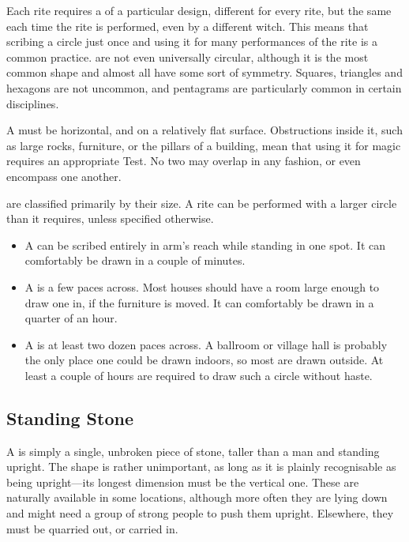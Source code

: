 Each rite requires a  of a particular design, different for every rite, but the same each time the rite is performed, even by a different witch.
This means that scribing a circle just once and using it for many performances of the rite is a common practice.
 are not even universally circular, although it is the most common shape and almost all have some sort of symmetry.
Squares, triangles and hexagons are not uncommon, and pentagrams are particularly common in certain disciplines.

A  must be horizontal, and on a relatively flat surface.
Obstructions inside it, such as large rocks, furniture, or the pillars of a building, mean that using it for magic requires an appropriate Test.
No two  may overlap in any fashion, or even encompass one another.

 are classified primarily by their size.
A rite can be performed with a larger circle than it requires, unless specified otherwise.
\begin{itemize}
	\item A  can be scribed entirely in arm's reach while standing in one spot.
		It can comfortably be drawn in a couple of minutes.
	\item A  is a few paces across.
		Most houses should have a room large enough to draw one in, if the furniture is moved.
		It can comfortably be drawn in a quarter of an hour.
	\item A  is at least two dozen paces across.
		A ballroom or village hall is probably the only place one could be drawn indoors, so most are drawn outside.
		At least a couple of hours are required to draw such a circle without haste.
\end{itemize}

\subsection{Standing Stone}

A  is simply a single, unbroken piece of stone, taller than a man and standing upright.
The shape is rather unimportant, as long as it is plainly recognisable as being upright---its longest dimension must be the vertical one.
These are naturally available in some locations, although more often they are lying down and might need a group of strong people to push them upright.
Elsewhere, they must be quarried out, or carried in.

